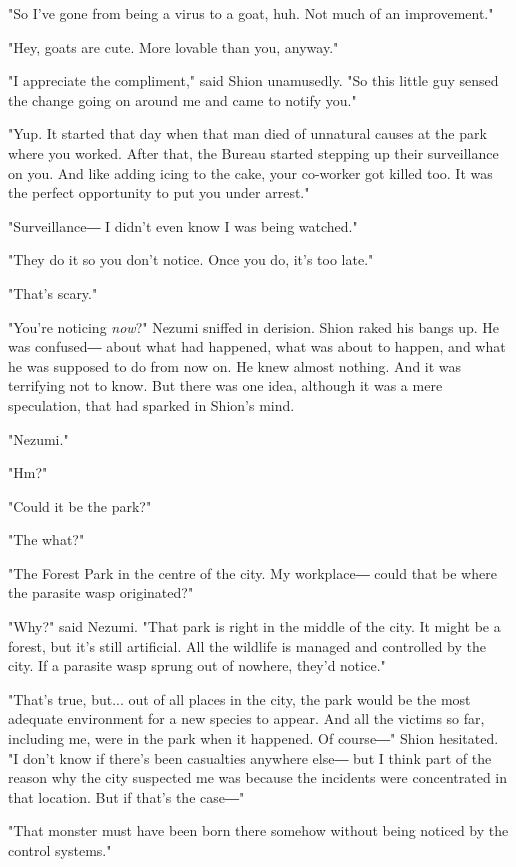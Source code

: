 "So I've gone from being a virus to a goat, huh. Not much of an
improvement."

"Hey, goats are cute. More lovable than you, anyway."

"I appreciate the compliment," said Shion unamusedly. "So this little
guy sensed the change going on around me and came to notify you."

"Yup. It started that day when that man died of unnatural causes at the
park where you worked. After that, the Bureau started stepping up their
surveillance on you. And like adding icing to the cake, your co-worker
got killed too. It was the perfect opportunity to put you under arrest."

"Surveillance― I didn't even know I was being watched."

"They do it so you don't notice. Once you do, it's too late."

"That's scary."

"You're noticing \emph{now}?" Nezumi sniffed in derision. Shion raked his bangs
up. He was confused― about what had happened, what was about to happen,
and what he was supposed to do from now on. He knew almost nothing. And
it was terrifying not to know. But there was one idea, although it was a
mere speculation, that had sparked in Shion's mind.

\mybreak

"Nezumi."

"Hm?"

"Could it be the park?"

"The what?"

"The Forest Park in the centre of the city. My workplace― could that be
where the parasite wasp originated?"

"Why?" said Nezumi. "That park is right in the middle of the city. It
might be a forest, but it's still artificial. All the wildlife is
managed and controlled by the city. If a parasite wasp sprung out of
nowhere, they'd notice."

"That's true, but... out of all places in the city, the park would be
the most adequate environment for a new species to appear. And all the
victims so far, including me, were in the park when it happened. Of
course―" Shion hesitated. "I don't know if there's been casualties
anywhere else― but I think part of the reason why the city suspected me
was because the incidents were concentrated in that location. But if
that's the case―"

"That monster must have been born there somehow without being noticed by
the control systems."


